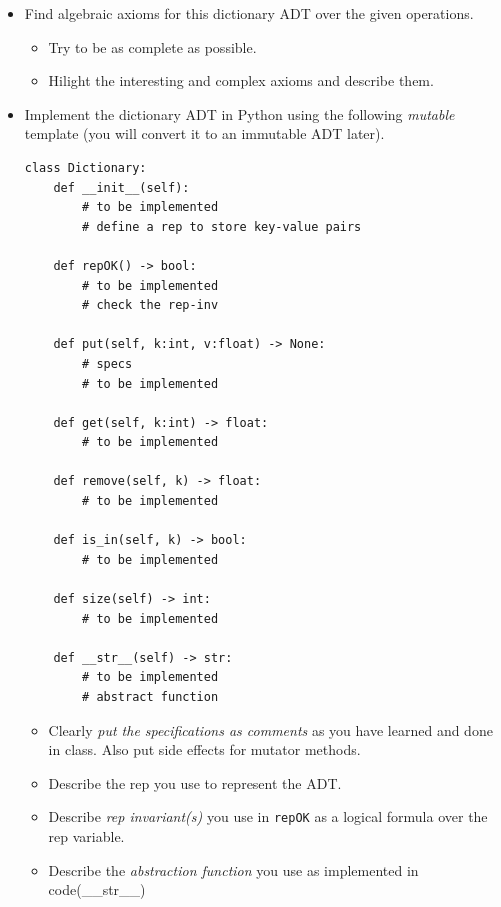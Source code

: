 \documentclass[oneside,11pt,dvipsnames]{book}
\newcommand{\code}[1]{\texttt{#1}}
\begin{document}
\begin{itemize}
\item Find algebraic axioms for this dictionary ADT over the given operations. 
\begin{itemize}
    \item Try to be as complete as possible. 
    \item Hilight the interesting and complex axioms and describe them. 
\end{itemize} 

\item Implement the dictionary ADT in Python using the following \emph{mutable} template (you will convert it to an immutable ADT later). 

\begin{lstlisting}
class Dictionary:
    def __init__(self):
        # to be implemented
        # define a rep to store key-value pairs

    def repOK() -> bool:
        # to be implemented
        # check the rep-inv

    def put(self, k:int, v:float) -> None:
        # specs
        # to be implemented

    def get(self, k:int) -> float:
        # to be implemented

    def remove(self, k) -> float:
        # to be implemented

    def is_in(self, k) -> bool:
        # to be implemented 

    def size(self) -> int:
        # to be implemented

    def __str__(self) -> str:
        # to be implemented
        # abstract function
\end{lstlisting}

    \begin{itemize}
    \item Clearly \emph{put the specifications as comments} as you have learned and done in class. Also put side effects for mutator methods.
    \item Describe the rep you use to represent the ADT. 
    \item Describe \emph{rep invariant(s)} you use in \code{repOK} as a logical formula over the rep variable.
    \item Describe the \emph{abstraction function} you use as implemented in code{(\_\_str\_\_)}
    \end{itemize}


\end{itemize}
\end{document}
